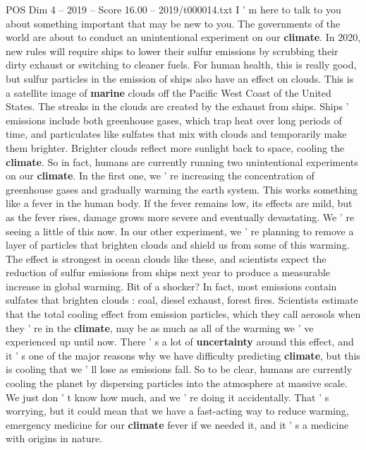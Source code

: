 \begin{textsample}{POS Dim 4 – 2019 – Score 16.00 – 2019/t000014.txt}  \label{ex:f4_pos_050}
I ' m here to talk to you about something important that may be new to you.
The governments of the world are about to conduct an unintentional experiment on our \textbf{climate}.
In 2020, new rules will require ships to lower their sulfur emissions by scrubbing their dirty exhaust or switching to cleaner fuels.
For human health, this is really good, but sulfur particles in the emission of ships also have an effect on clouds.
This is a satellite image of \textbf{marine} clouds off the Pacific West Coast of the United States.
The streaks in the clouds are created by the exhaust from ships.
Ships ' emissions include both greenhouse gases, which trap heat over long periods of time, and particulates like sulfates that mix with clouds and temporarily make them brighter.
Brighter clouds reflect more sunlight back to space, cooling the \textbf{climate}.
So in fact, humans are currently running two unintentional experiments on our \textbf{climate}.
In the first one, we ' re increasing the concentration of greenhouse gases and gradually warming the earth system.
This works something like a fever in the human body.
If the fever remains low, its effects are mild, but as the fever rises, damage grows more severe and eventually devastating.
We ' re seeing a little of this now.
In our other experiment, we ' re planning to remove a layer of particles that brighten clouds and shield us from some of this warming.
The effect is strongest in ocean clouds like these, and scientists expect the reduction of sulfur emissions from ships next year to produce a measurable increase in global warming.
Bit of a shocker?
In fact, most emissions contain sulfates that brighten clouds : coal, diesel exhaust, forest fires.
Scientists estimate that the total cooling effect from emission particles, which they call aerosols when they ' re in the \textbf{climate}, may be as much as all of the warming we ' ve experienced up until now.
There ' s a lot of \textbf{uncertainty} around this effect, and it ' s one of the major reasons why we have difficulty predicting \textbf{climate}, but this is cooling that we ' ll lose as emissions fall.
So to be clear, humans are currently cooling the planet by dispersing particles into the atmosphere at massive scale.
We just don ' t know how much, and we ' re doing it accidentally.
That ' s worrying, but it could mean that we have a fast-acting way to reduce warming, emergency medicine for our \textbf{climate} fever if we needed it, and it ' s a medicine with origins in nature.

\end{textsample}
